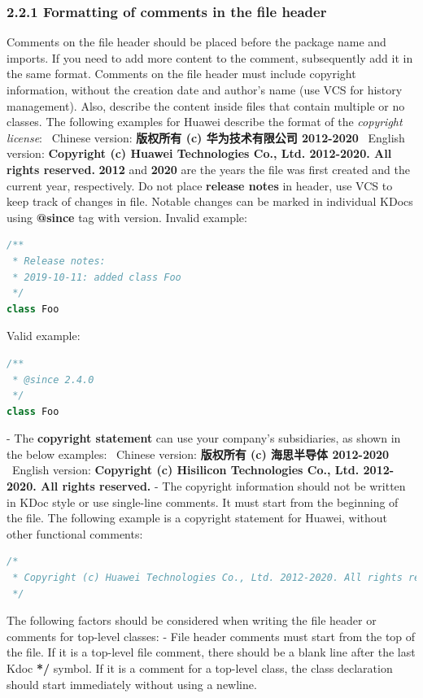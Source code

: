 \subsubsection*{\textbf{2.2.1 Formatting of comments in the file header}}
\leavevmode\newline
\label{sec:2.2.1}
Comments on the file header should be placed before the package name and imports. If you need to add more content to the comment, subsequently add it in the same format.
Comments on the file header must include copyright information, without the creation date and author's name (use VCS for history management).
Also, describe the content inside files that contain multiple or no classes.
The following examples for Huawei describe the format of the \textit{copyright license}: \
Chinese version: \textbf{版权所有 (c) 华为技术有限公司 2012-2020} \
English version: \textbf{Copyright (c) Huawei Technologies Co., Ltd. 2012-2020. All rights reserved.}
\textbf{2012} and \textbf{2020} are the years the file was first created and the current year, respectively.
Do not place \textbf{release notes} in header, use VCS to keep track of changes in file. Notable changes can be marked in individual KDocs using \textbf{@since} tag with version.
Invalid example:
\begin{lstlisting}[language=Kotlin]
/**
 * Release notes:
 * 2019-10-11: added class Foo
 */
class Foo
\end{lstlisting}
Valid example:
\begin{lstlisting}[language=Kotlin]
/**
 * @since 2.4.0
 */
class Foo
\end{lstlisting}
- The \textbf{copyright statement} can use your company's subsidiaries, as shown in the below examples: \
Chinese version: \textbf{版权所有 (c) 海思半导体 2012-2020} \
English version: \textbf{Copyright (c) Hisilicon Technologies Co., Ltd. 2012-2020. All rights reserved.}
- The copyright information should not be written in KDoc style or use single-line comments. It must start from the beginning of the file.
The following example is a copyright statement for Huawei, without other functional comments:
\begin{lstlisting}[language=Kotlin]
/*
 * Copyright (c) Huawei Technologies Co., Ltd. 2012-2020. All rights reserved.
 */
\end{lstlisting}
The following factors should be considered when writing the file header or comments for top-level classes:
- File header comments must start from the top of the file. If it is a top-level file comment, there should be a blank line after the last Kdoc \textbf{*/} symbol. If it is a comment for a top-level class, the class declaration should start immediately without using a newline.
